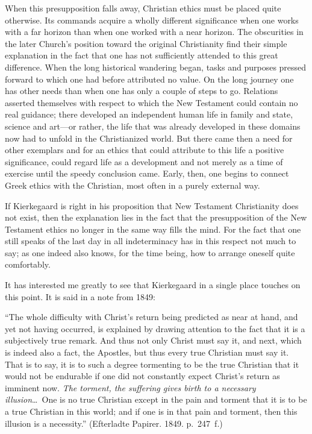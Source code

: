 \documentclass[12pt,a4paper]{book}
\newcommand{\opage}[1]{\marginnote{\footnotesize\textit{[#1]}}}
\begin{document}
When this presupposition falls away, Christian ethics must be placed
quite otherwise. Its commands acquire a wholly different significance
when one works with a far horizon than when one worked with a near
horizon. The obscurities in the later Church's position toward the
original Christianity find their simple explanation in the fact that one
has not sufficiently attended to this great difference. When the long
historical wandering began, tasks and purposes pressed forward
\opage{153}to which one had before attributed no value. On the long
journey one has other needs than when one has only a couple of steps to
go. Relations asserted themselves with respect to which the New Testament
could contain no real guidance; there developed an independent human life
in family and state, science and art---or rather, the life that was
already developed in these domains now had to unfold in the Christianized
world. But there came then a need for other exemplars and for an ethics
that could attribute to this life a positive significance, could regard
life as a development and not merely as a time of exercise until the
speedy conclusion came. Early, then, one begins to connect Greek ethics
with the Christian, most often in a purely external way.

If Kierkegaard is right in his proposition that New Testament
Christianity does not exist, then the explanation lies in the fact that
the presupposition of the New Testament ethics no longer in the same way
fills the mind. For the fact that one still speaks of the last day in all
indeterminacy has in this respect not much to say; as one indeed also
knows, for the time being, how to arrange oneself quite comfortably.

It has interested me greatly to see that Kierkegaard in a single place
touches on this point. It is said in a note from 1849:

``The whole difficulty with Christ's return being predicted as near at
hand, and yet not having occurred, is explained by drawing attention to
the fact that it is a subjectively true remark. And thus not only Christ
must say it, and next, which is indeed also a fact, the Apostles, but
thus every true Christian must say it. That is to say, it is to such a
degree tormenting to be the true Christian that it would not be endurable
if one did not constantly expect Christ's return as imminent
\opage{154}now. \textit{The torment, the suffering gives birth to a
necessary illusion}\dots\ One is no true Christian except in the pain and
torment that it is to be a true Christian in this world; and if one is in
that pain and torment, then this illusion is a necessity.'' (Efterladte
Papirer. 1849. p.~247~f.)
\end{document}
